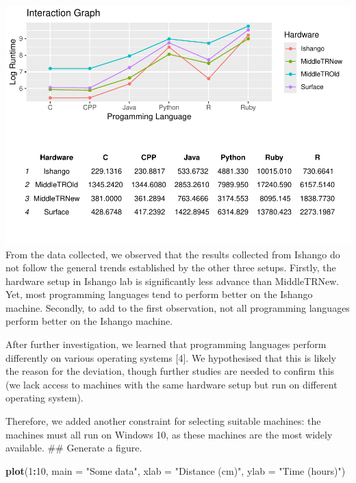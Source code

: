 \documentclass[12pt,halfline,a4paper,]{ouparticle}
\newenvironment{Shaded}{\begin{snugshade}}{\end{snugshade}}
\newcommand{\AttributeTok}[1]{\textcolor[rgb]{0.13,0.29,0.53}{#1}}
\newcommand{\DecValTok}[1]{\textcolor[rgb]{0.00,0.00,0.81}{#1}}
\newcommand{\FunctionTok}[1]{\textcolor[rgb]{0.13,0.29,0.53}{\textbf{#1}}}
\newcommand{\NormalTok}[1]{#1}
\newcommand{\SpecialCharTok}[1]{\textcolor[rgb]{0.81,0.36,0.00}{\textbf{#1}}}
\newcommand{\StringTok}[1]{\textcolor[rgb]{0.31,0.60,0.02}{#1}}
\begin{document}
\includegraphics[width=1\linewidth]{skeleton_files/figure-latex/unnamed-chunk-2-1}
From the data collected, we observed that the results collected from
Ishango do not follow the general trends established by the other three
setups. Firstly, the hardware setup in Ishango lab is significantly less
advance than MiddleTRNew. Yet, most programming languages tend to
perform better on the Ishango machine. Secondly, to add to the first
observation, not all programming languages perform better on the Ishango
machine.

After further investigation, we learned that programming languages
perform differently on various operating systems {[}4{]}. We
hypothesised that this is likely the reason for the deviation, though
further studies are needed to confirm this (we lack access to machines
with the same hardware setup but run on different operating system).

Therefore, we added another constraint for selecting suitable machines:
the machines must all run on Windows 10, as these machines are the most
widely available. \#\# Generate a figure.

\begin{Shaded}
\begin{Highlighting}[]
\FunctionTok{plot}\NormalTok{(}\DecValTok{1}\SpecialCharTok{:}\DecValTok{10}\NormalTok{, }\AttributeTok{main =} \StringTok{"Some data"}\NormalTok{, }\AttributeTok{xlab =} \StringTok{"Distance (cm)"}\NormalTok{, }\AttributeTok{ylab =} \StringTok{"Time (hours)"}\NormalTok{)}
\end{Highlighting}
\end{Shaded}
\end{document}
